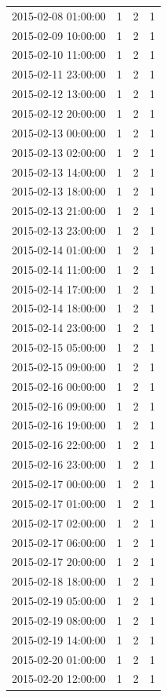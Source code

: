 \begin{tabular}{lrrr}
2015-02-08 01:00:00 & 1 & 2 & 1 \\
2015-02-09 10:00:00 & 1 & 2 & 1 \\
2015-02-10 11:00:00 & 1 & 2 & 1 \\
2015-02-11 23:00:00 & 1 & 2 & 1 \\
2015-02-12 13:00:00 & 1 & 2 & 1 \\
2015-02-12 20:00:00 & 1 & 2 & 1 \\
2015-02-13 00:00:00 & 1 & 2 & 1 \\
2015-02-13 02:00:00 & 1 & 2 & 1 \\
2015-02-13 14:00:00 & 1 & 2 & 1 \\
2015-02-13 18:00:00 & 1 & 2 & 1 \\
2015-02-13 21:00:00 & 1 & 2 & 1 \\
2015-02-13 23:00:00 & 1 & 2 & 1 \\
2015-02-14 01:00:00 & 1 & 2 & 1 \\
2015-02-14 11:00:00 & 1 & 2 & 1 \\
2015-02-14 17:00:00 & 1 & 2 & 1 \\
2015-02-14 18:00:00 & 1 & 2 & 1 \\
2015-02-14 23:00:00 & 1 & 2 & 1 \\
2015-02-15 05:00:00 & 1 & 2 & 1 \\
2015-02-15 09:00:00 & 1 & 2 & 1 \\
2015-02-16 00:00:00 & 1 & 2 & 1 \\
2015-02-16 09:00:00 & 1 & 2 & 1 \\
2015-02-16 19:00:00 & 1 & 2 & 1 \\
2015-02-16 22:00:00 & 1 & 2 & 1 \\
2015-02-16 23:00:00 & 1 & 2 & 1 \\
2015-02-17 00:00:00 & 1 & 2 & 1 \\
2015-02-17 01:00:00 & 1 & 2 & 1 \\
2015-02-17 02:00:00 & 1 & 2 & 1 \\
2015-02-17 06:00:00 & 1 & 2 & 1 \\
2015-02-17 20:00:00 & 1 & 2 & 1 \\
2015-02-18 18:00:00 & 1 & 2 & 1 \\
2015-02-19 05:00:00 & 1 & 2 & 1 \\
2015-02-19 08:00:00 & 1 & 2 & 1 \\
2015-02-19 14:00:00 & 1 & 2 & 1 \\
2015-02-20 01:00:00 & 1 & 2 & 1 \\
2015-02-20 12:00:00 & 1 & 2 & 1 \\

\end{tabular}
